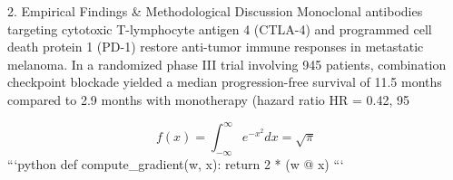 2. Empirical Findings & Methodological Discussion
Monoclonal antibodies targeting cytotoxic T-lymphocyte antigen 4 (CTLA-4) and programmed cell death protein 1 (PD-1) restore anti-tumor immune responses in metastatic melanoma. In a randomized phase III trial involving 945 patients, combination checkpoint blockade yielded a median progression-free survival of 11.5 months compared to 2.9 months with monotherapy (hazard ratio HR = 0.42, 95%

$$ f(x) = \int_{-\infty}^{\infty} e^{-x^2} dx = \sqrt{\pi} $$ 
```python
def compute_gradient(w, x):
    return 2 * (w @ x)
```